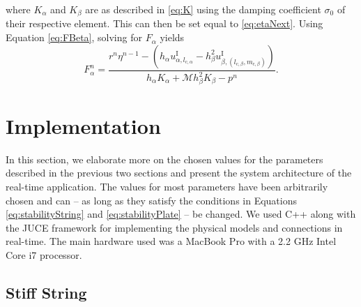 \documentclass{article}
\begin{document}
where $K_\alpha$ and $K_\beta$ are as described in \eqref{eq:K} using the damping coefficient $\sigma_0$ of their respective element. This can then be set equal to \eqref{eq:etaNext}. Using Equation \eqref{eq:FBeta}, solving for $F_\alpha$ yields
\begin{equation}
    F_\alpha^n = \frac{r^n\eta^{n-1}-(h_\alpha u_{\alpha, l_{\text{c},\alpha}}^\text{I} - h^2_\beta u_{\beta,(l_{\text{c},\beta},m_{\text{c},\beta})}^\text{I})}{h_\alpha K_\alpha + \mathcal{M}h^2_\beta K_\beta-p^n}.
\end{equation}

\section{Implementation}\label{sec:implementation}
In this section, we elaborate more on the chosen values for the parameters described in the previous two sections and present the system architecture of the real-time application. The values for most parameters have been arbitrarily chosen and can -- as long as they satisfy the conditions in Equations \eqref{eq:stabilityString} and \eqref{eq:stabilityPlate} -- be changed. We used C++ along with the JUCE framework \cite{JUCE2019} for implementing the physical models and connections in real-time. The main hardware used was a MacBook Pro with a 2.2 GHz Intel Core i7 processor.

\subsection{Stiff String}
\end{document}
